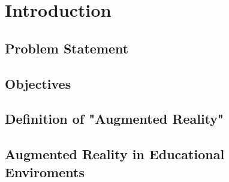 \section*{Introduction}
\subsection{Problem Statement}
\subsection{Objectives}
\subsection{Definition of "Augmented Reality"}
\subsection{Augmented Reality in Educational Enviroments}